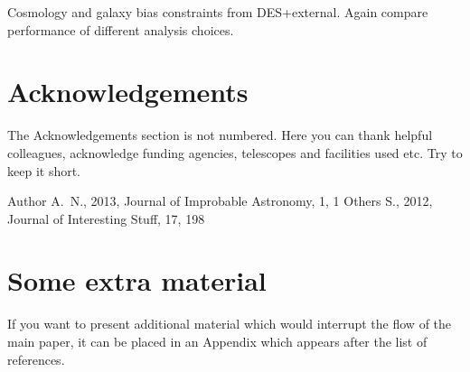 \documentclass[fleqn,usenatbib]{mnras}
\begin{document}
Cosmology and galaxy bias constraints from DES+external. Again compare performance of different analysis choices.

\section*{Acknowledgements}

The Acknowledgements section is not numbered. Here you can thank helpful
colleagues, acknowledge funding agencies, telescopes and facilities used etc.
Try to keep it short.




%


\begin{thebibliography}{99}
Author A.~N., 2013, Journal of Improbable Astronomy, 1, 1
Others S., 2012, Journal of Interesting Stuff, 17, 198
\end{thebibliography}



\appendix

\section{Some extra material}

If you want to present additional material which would interrupt the flow of the main paper,
it can be placed in an Appendix which appears after the list of references.



\bsp	%
\label{lastpage}
\end{document}
